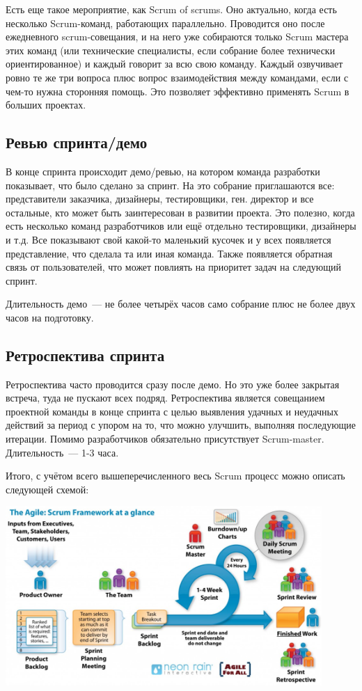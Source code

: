 \documentclass{../../text-style}
\begin{document}
Есть еще такое мероприятие, как Scrum of scrums. Оно актуально, когда есть несколько Scrum-команд, работающих параллельно. Проводится оно после ежедневного scrum-совещания, и на него уже собираются только Scrum мастера этих команд (или технические специалисты, если собрание более технически ориентированное) и каждый говорит за всю свою команду. Каждый озвучивает ровно те же три вопроса плюс вопрос взаимодействия между командами, если с чем-то нужна сторонняя помощь. Это позволяет эффективно применять Scrum в больших проектах.

\subsection{Ревью спринта/демо}

В конце спринта происходит демо/ревью, на котором команда разработки показывает, что было сделано за спринт. На это собрание приглашаются все: представители заказчика, дизайнеры, тестировщики, ген. директор и все остальные, кто может быть заинтересован в развитии проекта. Это полезно, когда есть несколько команд разработчиков или ещё отдельно тестировщики, дизайнеры и т.д. Все показывают свой какой-то маленький кусочек и у всех появляется представление, что сделала та или иная команда. Также появляется обратная связь от пользователей, что может повлиять на приоритет задач на следующий спринт. 

Длительность демо~--- не более четырёх часов само собрание плюс не более двух часов на подготовку.

\subsection{Ретроспектива спринта}

Ретроспектива часто проводится сразу после демо. Но это уже более закрытая встреча, туда не пускают всех подряд. Ретроспектива является совещанием проектной команды в конце спринта с целью выявления удачных и неудачных действий за период с упором на то, что можно улучшить, выполняя последующие итерации. Помимо разработчиков обязательно присутствует Scrum-master. Длительность~--- 1-3 часа.

Итого, с учётом всего вышеперечисленного весь Scrum процесс можно описать следующей схемой:

\begin{center}
    \includegraphics[width=0.9\textwidth]{scrumProcess.png}
\end{center}
\end{document}
